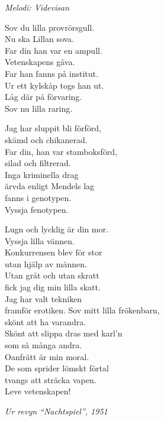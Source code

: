 {\footnotesize\textit{Melodi: Videvisan}}\par
\vspace{10pt}
Sov du lilla provrörsgull.\\
Nu ska Lillan sova.\\
Far din han var en ampull.\\
Vetenskapens gåva.\\
Far han fanns på institut.\\
Ur ett kylskåp togs han ut.\\
Låg där på förvaring.\\
Sov nu lilla raring.\par
\vspace{10pt}
Jag har sluppit bli förförd,\\
skämd och chikanerad.\\
Far din, han var stamboksförd,\\
silad och filtrerad.\\
Inga kriminella drag\\
ärvda enligt Mendels lag\\
fanns i genotypen.\\
Vyssja fenotypen.\par
\vspace{10pt}
Lugn och lycklig är din mor.\\
Vyssja lilla vännen.\\
Konkurrensen blev för stor\\
utan hjälp av männen.\\
Utan gråt och utan skratt\\
fick jag dig min lilla skatt.\\
Jag har valt tekniken\\
framför erotiken.
\newpage
Sov mitt lilla frökenbarn,\\
skönt att ha varandra.\\
Skönt att slippa dras med karl'n\\
som så många andra.\\
Oanfrätt är min moral.\\
De som sprider lömskt förtal\\
tvangs att sträcka vapen.\\
Leve vetenskapen!\par
\vspace{10pt}
{\footnotesize\textit{Ur revyn “Nachtspiel”, 1951}}
